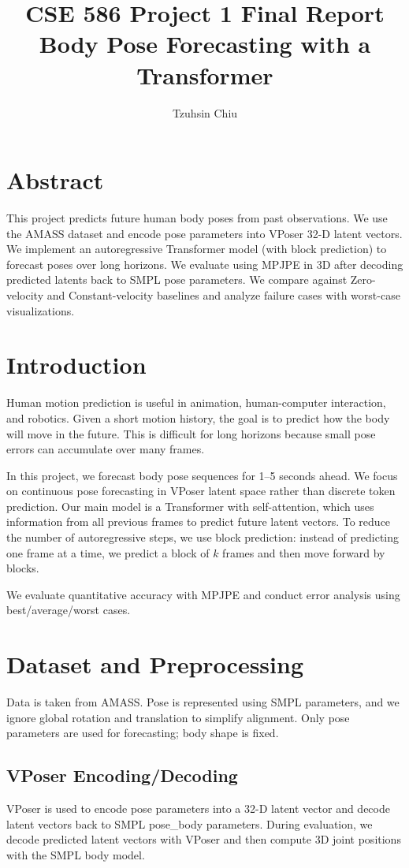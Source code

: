 \documentclass[10pt,twocolumn]{article}
\title{\textbf{CSE 586 Project 1 Final Report}\\Body Pose Forecasting with a Transformer}
\author{Tzuhsin Chiu}
\date{}
\begin{document}
\maketitle
\thispagestyle{empty}

\section*{Abstract}
This project predicts future human body poses from past observations.
We use the AMASS dataset and encode pose parameters into VPoser 32-D latent vectors.
We implement an autoregressive Transformer model (with block prediction) to forecast poses over long horizons.
We evaluate using MPJPE in 3D after decoding predicted latents back to SMPL pose parameters.
We compare against Zero-velocity and Constant-velocity baselines and analyze failure cases with worst-case visualizations.

\section{Introduction}
Human motion prediction is useful in animation, human-computer interaction, and robotics.
Given a short motion history, the goal is to predict how the body will move in the future.
This is difficult for long horizons because small pose errors can accumulate over many frames.

In this project, we forecast body pose sequences for 1--5 seconds ahead.
We focus on continuous pose forecasting in VPoser latent space rather than discrete token prediction.
Our main model is a Transformer with self-attention, which uses information from all previous frames to predict future latent vectors.
To reduce the number of autoregressive steps, we use block prediction: instead of predicting one frame at a time, we predict a block of $k$ frames and then move forward by blocks.

We evaluate quantitative accuracy with MPJPE and conduct error analysis using best/average/worst cases.

\section{Dataset and Preprocessing}
Data is taken from AMASS.
Pose is represented using SMPL parameters, and we ignore global rotation and translation to simplify alignment.
Only pose parameters are used for forecasting; body shape is fixed.

\subsection{VPoser Encoding/Decoding}
VPoser is used to encode pose parameters into a 32-D latent vector and decode latent vectors back to SMPL pose\_body parameters.
During evaluation, we decode predicted latent vectors with VPoser and then compute 3D joint positions with the SMPL body model.
\end{document}
